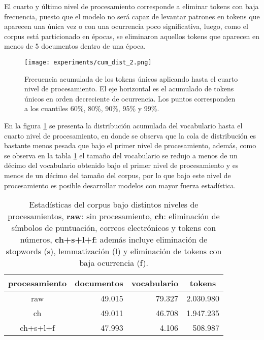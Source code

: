 \documentclass[letterpaper,12pt,oneside]{book} %
\begin{document}
El cuarto y último nivel de procesamiento corresponde a eliminar tokens con baja frecuencia, puesto que el modelo no será capaz de levantar patrones en tokens que aparecen una única vez o con una ocurrencia poco significativa, luego, como el corpus está particionado en épocas, se eliminaron aquellos tokens que aparecen en menos de 5 documentos dentro de una época.

\begin{figure}
    \centering
    \texttt{[image: experiments/cum\_dist\_2.png]}
    \caption{Frecuencia acumulada de los tokens únicos aplicando hasta el cuarto nivel de procesamiento. El eje horizontal es el acumulado de tokens únicos en orden decreciente de ocurrencia. Los puntos corresponden a los cuantiles 60\%, 80\%, 90\%, 95\% y 99\%.}
    \label{img:cum_dist2}
\end{figure}

En la figura \ref{img:cum_dist2} se presenta la distribución acumulada del vocabulario hasta el cuarto nivel de procesamiento, en donde se observa que la cola de distribución es bastante menos pesada que bajo el primer nivel de procesamiento, además, como se observa en la tabla \ref{table:processing_stats} el tamaño del vocabulario se redujo a menos de un décimo del vocabulario obtenido bajo el primer nivel de procesamiento y es menos de un décimo del tamaño del corpus, por lo que bajo este nivel de procesamiento es posible desarrollar modelos con mayor fuerza estadística.

\begin{table}[H]
    \begin{tabular}{|c|r|r|r|}
        \hline
        procesamiento & \multicolumn{1}{c|}{documentos} & \multicolumn{1}{c|}{vocabulario} & \multicolumn{1}{c|}{tokens} \\ \hline
        raw          & 49.015                           & 79.327                            & 2.030.980                     \\ \hline
        ch    & 49.011                           & 46.708                            & 1.947.235                     \\ \hline
        ch+s+l+f      & 47.993                           & 4.106                             & 508.987                      \\ \hline
        \end{tabular}
    \caption{Estadísticas del corpus bajo distintos niveles de procesamientos, \textbf{raw}: sin procesamiento, \textbf{ch}: eliminación de símbolos de puntuación, correos electrónicos y tokens con números, \textbf{ch+s+l+f}: además incluye eliminación de stopwords (s), lemmatización (l) y eliminación de tokens con baja ocurrencia (f).}
    \label{table:processing_stats}
\end{table}
\end{document}
